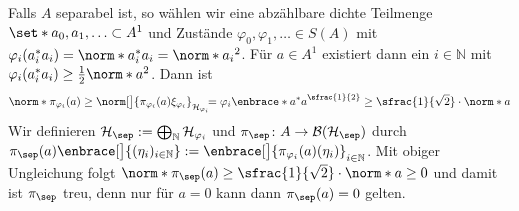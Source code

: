 \begin{beweis}
	Falls $A$ separabel ist, so wählen wir eine abzählbare dichte Teilmenge $\set*{a_0,a_1,\ldots } \subset A^1$ und Zustände $\varphi_0, \varphi_1,\ldots \in S(A)$ mit $\varphi_i(a_i^*a_i) = \norm*{a_i^*a_i}= \norm*{a_i}^2$. 
	Für $a \in A^1$ existiert dann ein $i \in \mathbb{N}$ mit $\varphi_i(a_i^*a_i) \ge \frac{1}{2} \norm*{a}^2$.
	Dann ist 
	\[
		\norm*{\pi_{\varphi_i}(a)} \ge \norm[\big]{\pi_{\varphi_i}(a) \xi_{\varphi_i}}_{\mathcal{H}_{\varphi_i}}\hspace{-1ex}
		= \varphi_i \enbrace*{a^*a}^{\sfrac{1}{2}} \ge \sfrac{1}{\sqrt{2}}\cdot \norm*{a}
	\]
	Wir definieren $\mathcal{H}_{\sep} := \bigoplus_{\mathbb{N}} \mathcal{H}_{\varphi_i}$ und $\pi_{\sep} \colon A \to \mathcal{B}(\mathcal{H}_{\sep})$ durch 
	\(
		\pi_{\sep}(a) \enbrace[\big]{(\eta_i)_{i \in \mathbb{N}}} := \enbrace[\big]{\pi_{\varphi_i}(a)(\eta_i)}_{i \in \mathbb{N}}
	\).
	Mit obiger Ungleichung folgt $\norm*{\pi_{\sep}(a)} \ge \sfrac{1}{\sqrt{2}} \cdot \norm*{a}\ge 0$ und damit ist $\pi_{\sep}$ treu, denn nur für $a=0$ kann dann $\pi_{\sep}(a)=0$ gelten.
\end{beweis}


